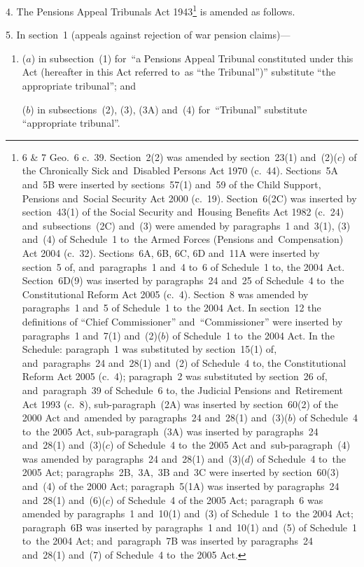 \documentclass[12pt,a4paper]{article}
\begin{document}
4.  The Pensions Appeal Tribunals Act 1943\footnote{6 \& 7 Geo.~6 c.~39.  Section~2(2) was amended by section~23(1) and~(2)($c$) of the Chronically Sick and~Disabled Persons Act 1970 (c.~44). Sections~5A and~5B were inserted by sections~57(1) and~59 of the Child Support, Pensions and~Social Security Act 2000 (c.~19). Section~6(2C) was inserted by section~43(1) of the Social Security and~Housing Benefits Act 1982 (c.~24) and~subsections~(2C) and~(3) were amended by paragraphs~1 and~3(1), (3) and~(4) of Schedule~1 to~the Armed Forces (Pensions and~Compensation) Act 2004 (c.~32). Sections~6A, 6B, 6C, 6D and~11A were inserted by section~5 of, and~paragraphs~1 and~4 to~6 of Schedule~1 to, the 2004 Act. Section~6D(9) was inserted by paragraphs~24 and~25 of Schedule~4 to~the Constitutional Reform Act 2005 (c.~4). Section~8 was amended by paragraphs~1 and~5 of Schedule~1 to~the 2004 Act. In section~12 the definitions of “Chief Commissioner” and~“Commissioner” were inserted by paragraphs~1 and~7(1) and~(2)($b$) of Schedule~1 to~the 2004 Act. In the Schedule: paragraph~1 was substituted by section~15(1) of, and~paragraphs~24 and~28(1) and~(2) of Schedule~4 to, the Constitutional Reform Act 2005 (c.~4); paragraph~2 was substituted by section~26 of, and~paragraph~39 of Schedule~6 to, the Judicial Pensions and~Retirement Act 1993 (c.~8), sub-paragraph~(2A) was inserted by section~60(2) of the 2000 Act and~amended by paragraphs~24 and~28(1) and~(3)($b$) of Schedule~4 to~the 2005 Act, sub-paragraph~(3A) was inserted by paragraphs~24 and~28(1) and~(3)($c$) of Schedule~4 to~the 2005 Act and~sub-paragraph~(4) was amended by paragraphs~24 and~28(1) and~(3)($d$) of Schedule~4 to~the 2005 Act; paragraphs~2B,~3A,~3B and~3C were inserted by section~60(3) and~(4) of the 2000 Act; paragraph~5(1A) was inserted by paragraphs~24 and~28(1) and~(6)($c$) of Schedule~4 of the 2005 Act; paragraph~6 was amended by paragraphs~1 and~10(1) and~(3) of Schedule~1 to~the 2004 Act; paragraph~6B was inserted by paragraphs~1 and~10(1) and~(5) of Schedule~1 to~the 2004 Act; and~paragraph~7B was inserted by paragraphs~24 and~28(1) and~(7) of Schedule~4 to~the 2005 Act. } is amended as follows.

\medskip

5.  In section~1 (appeals against rejection of war pension claims)—
\begin{enumerate}\item[]
($a$) in subsection~(1) for~“a Pensions Appeal Tribunal constituted under this Act (hereafter in this Act referred to~as “the Tribunal”)” substitute “the appropriate tribunal”; and

($b$) in subsections~(2), (3), (3A) and~(4) for~“Tribunal” substitute “appropriate tribunal”.
\end{enumerate}
\end{document}
